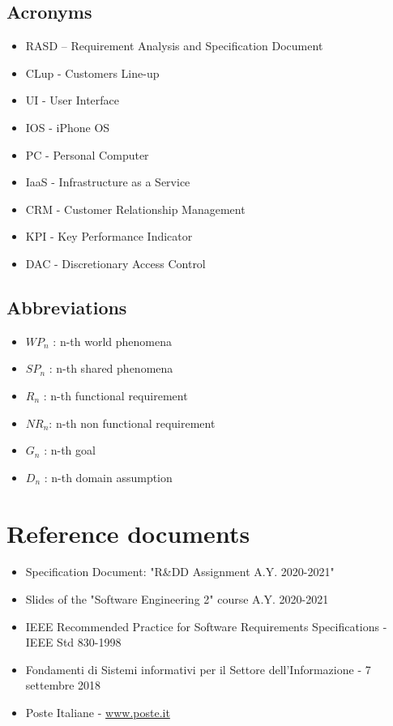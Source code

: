 \documentclass[a4paper,12pt]{report}
\begin{document}
\subsection{Acronyms}
\begin{itemize}
	\item RASD – Requirement Analysis and Specification Document
	\item CLup - Customers Line-up
	\item UI - User Interface
	\item IOS - iPhone OS
	\item PC - Personal Computer
	\item IaaS - Infrastructure as a Service
	\item CRM - Customer Relationship Management
	\item KPI - Key Performance Indicator
	\item DAC - Discretionary Access Control
\end{itemize}


\subsection{Abbreviations}
\begin{itemize}
	\item  $WP_n$ : n-th world phenomena
	\item  $SP_n$ : n-th shared phenomena
	\item  $R_n$ : n-th functional requirement
	\item  $NR_n$: n-th non functional requirement
	\item  $G_n$ : n-th goal
	\item  $D_n$ : n-th domain assumption
\end{itemize}


\section{Reference documents} \label{Reference documents}
\begin{itemize}
	\item Specification Document: "R\&DD Assignment A.Y. 2020-2021"
	\item Slides of the "Software Engineering 2" course A.Y. 2020-2021
	\item IEEE Recommended Practice for Software Requirements Specifications - IEEE Std 830-1998
	\item Fondamenti di Sistemi informativi per il Settore dell’Informazione - 7 settembre 2018
	\item Poste Italiane - \url{www.poste.it}
\end{itemize}
\end{document}
